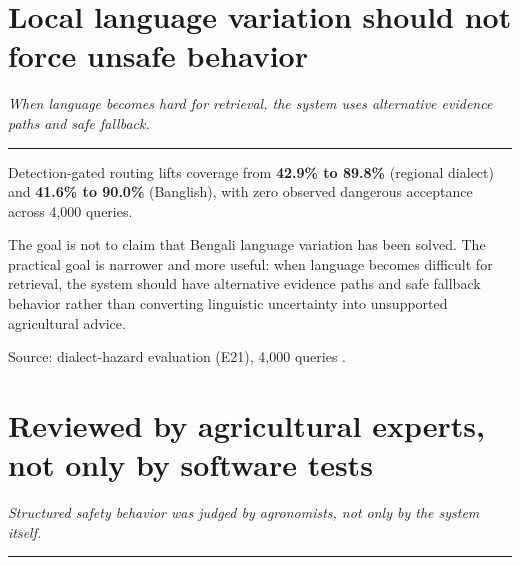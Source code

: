 \documentclass[11pt,a4paper]{article}
\newcommand{\MEASURED}{\badgeM{MEASURED}}
\newcommand{\takeaway}[1]{{\color{kcgrey}\itshape\large #1}\par\vspace{2pt}%
  {\color{kcline}\rule{\linewidth}{0.8pt}}\par\vspace{6pt}}
\newcommand{\srcfoot}[1]{\par\vspace{4pt}{\color{kcline}\rule{\linewidth}{0.4pt}}\par
  {\footnotesize\color{kcgrey}#1}\par}
\begin{document}
\newpage
\section*{\color{kcgreen}Local language variation should not force unsafe behavior}
\takeaway{When language becomes hard for retrieval, the system uses alternative evidence paths and safe fallback.}

\begin{center}
\end{center}

Detection-gated routing lifts coverage from \textbf{42.9\% to 89.8\%} (regional
dialect) and \textbf{41.6\% to 90.0\%} (Banglish), with zero observed dangerous
acceptance across 4,000 queries.

\vspace{3pt}
The goal is not to claim that Bengali language variation has been solved. The
practical goal is narrower and more useful: when language becomes difficult for
retrieval, the system should have alternative evidence paths and safe fallback
behavior rather than converting linguistic uncertainty into unsupported
agricultural advice.

\srcfoot{Source: dialect-hazard evaluation (E21), 4,000 queries \MEASURED{}.}

\newpage
\section*{\color{kcgreen}Reviewed by agricultural experts, not only by software tests}
\takeaway{Structured safety behavior was judged by agronomists, not only by the system itself.}
\end{document}

